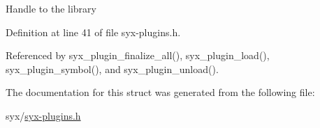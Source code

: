 Handle to the library 

Definition at line 41 of file syx-plugins.h.

Referenced by syx\_\-plugin\_\-finalize\_\-all(), syx\_\-plugin\_\-load(), syx\_\-plugin\_\-symbol(), and syx\_\-plugin\_\-unload().

The documentation for this struct was generated from the following file:\begin{CompactItemize}
\item 
syx/\hyperlink{syx-plugins_8h}{syx-plugins.h}\end{CompactItemize}
